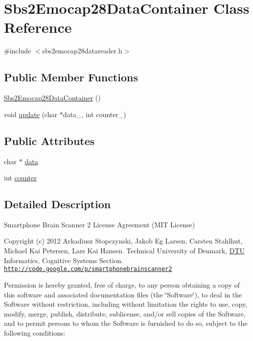 \hypertarget{classSbs2Emocap28DataContainer}{\section{Sbs2\-Emocap28\-Data\-Container Class Reference}
\label{classSbs2Emocap28DataContainer}
}


{\ttfamily \#include $<$sbs2emocap28datareader.\-h$>$}

\subsection*{Public Member Functions}
\begin{DoxyCompactItemize}
\item 
\hyperlink{classSbs2Emocap28DataContainer_a4a808fc6705415a114d30a7d0bb17810}{Sbs2\-Emocap28\-Data\-Container} ()
\item 
void \hyperlink{classSbs2Emocap28DataContainer_a5729680a3fd18a5e98e4ec439f9d3812}{update} (char $\ast$data\-\_\-, int counter\-\_\-)
\end{DoxyCompactItemize}
\subsection*{Public Attributes}
\begin{DoxyCompactItemize}
\item 
char $\ast$ \hyperlink{classSbs2Emocap28DataContainer_a75d846cbb3de36cd05e33bf69638cda5}{data}
\item 
int \hyperlink{classSbs2Emocap28DataContainer_adb1eef2558c19b1c1d2b4e53a72f2bc8}{counter}
\end{DoxyCompactItemize}


\subsection{Detailed Description}
Smartphone Brain Scanner 2 License Agreement (M\-I\-T License)

Copyright (c) 2012 Arkadiusz Stopczynski, Jakob Eg Larsen, Carsten Stahlhut, Michael Kai Petersen, Lars Kai Hansen. Technical University of Denmark, \hyperlink{namespaceDTU}{D\-T\-U} Informatics, Cognitive Systems Section. \href{http://code.google.com/p/smartphonebrainscanner2}{\tt http\-://code.\-google.\-com/p/smartphonebrainscanner2}

Permission is hereby granted, free of charge, to any person obtaining a copy of this software and associated documentation files (the \char`\"{}\-Software\char`\"{}), to deal in the Software without restriction, including without limitation the rights to use, copy, modify, merge, publish, distribute, sublicense, and/or sell copies of the Software, and to permit persons to whom the Software is furnished to do so, subject to the following conditions\-:

